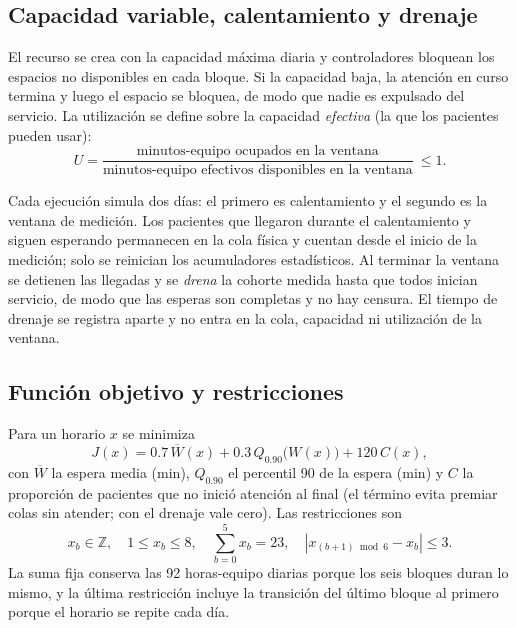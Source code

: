 \subsection{Capacidad variable, calentamiento y drenaje}
El recurso se crea con la capacidad máxima diaria y controladores bloquean los espacios no
disponibles en cada bloque. Si la capacidad baja, la atención en curso termina y luego el
espacio se bloquea, de modo que nadie es expulsado del servicio. La utilización se define
sobre la capacidad \emph{efectiva} (la que los pacientes pueden usar):
\begin{equation}
U=\frac{\text{minutos-equipo ocupados en la ventana}}
       {\text{minutos-equipo efectivos disponibles en la ventana}}\ \le 1.
\end{equation}

Cada ejecución simula dos días: el primero es calentamiento y el segundo es la ventana de
medición. Los pacientes que llegaron durante el calentamiento y siguen esperando
permanecen en la cola física y cuentan desde el inicio de la medición; solo se reinician
los acumuladores estadísticos. Al terminar la ventana se detienen las llegadas y se
\emph{drena} la cohorte medida hasta que todos inician servicio, de modo que las esperas
son completas y no hay censura. El tiempo de drenaje se registra aparte y no entra en la
cola, capacidad ni utilización de la ventana.

\subsection{Función objetivo y restricciones}
Para un horario $x$ se minimiza
\begin{equation}
J(x)=0.7\,\overline{W}(x)+0.3\,Q_{0.90}\bigl(W(x)\bigr)+120\,C(x),
\end{equation}
con $\overline{W}$ la espera media (min), $Q_{0.90}$ el percentil 90 de la espera (min) y
$C$ la proporción de pacientes que no inició atención al final (el término evita premiar
colas sin atender; con el drenaje vale cero). Las restricciones son
\begin{equation}
x_b\in\mathbb{Z},\quad 1\le x_b\le 8,\quad \sum_{b=0}^{5}x_b=23,\quad
|x_{(b+1)\bmod 6}-x_b|\le 3.
\end{equation}
La suma fija conserva las 92 horas-equipo diarias porque los seis bloques duran lo mismo,
y la última restricción incluye la transición del último bloque al primero porque el
horario se repite cada día.
